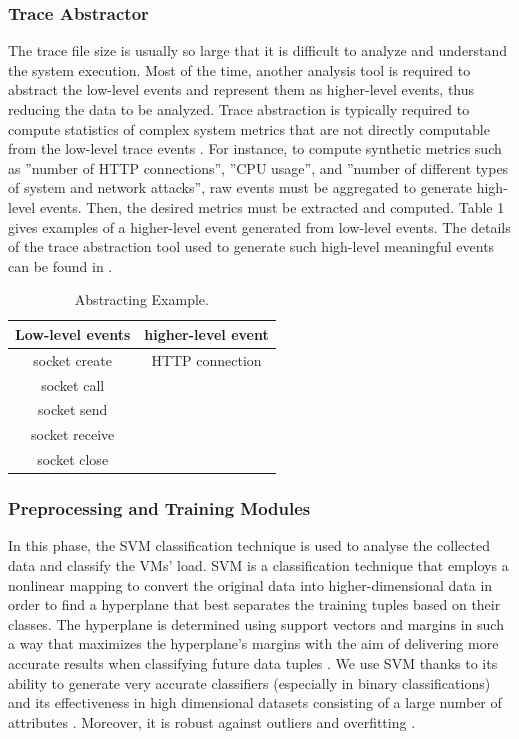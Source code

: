 \documentclass[twocolumn]{bmcart}%
\begin{document}
\subsubsection*{Trace Abstractor}
The trace file size is usually so large that it is difficult to analyze and understand the system execution. Most of the time, another analysis tool is required to abstract the low-level events and represent them as higher-level events, thus reducing the data to be analyzed. Trace abstraction is typically required to compute statistics of complex system metrics that are not directly computable from the low-level trace events \cite{ezzati2013framework}. For instance, to compute synthetic  metrics such as ”number of HTTP connections”, ”CPU usage”, and ”number of different types of system and network attacks”, raw events must be aggregated to generate high-level events. Then, the desired metrics must be extracted and computed. Table 1 gives examples of a higher-level event generated from low-level events. The details of the trace abstraction tool used to generate such high-level meaningful events can be found in \cite{ezzati2012stateful}.

\begin{table}[ht]\small
\caption{Abstracting Example.}
\centering
 \begin{tabular}{c c}
 \hline
 \textbf{Low-level events} & \textbf{higher-level event} \\
\hline
  socket create  & HTTP connection\\
  socket call  & \\
  socket send & \\
  socket receive & \\
  socket close & \\
\end{tabular}
\end{table}

\subsubsection*{Preprocessing and Training Modules}

In this phase, the SVM \cite{han2011data} classification technique is used to analyse the collected data and classify the VMs' load. SVM is a classification technique that employs a nonlinear mapping to convert the original data into higher-dimensional data in order to find a hyperplane that best separates the training tuples based on their classes. The hyperplane is determined using support vectors and margins in such a way that maximizes the hyperplane's margins with the aim of delivering more accurate results when classifying future data tuples \cite{han2011data}. We use SVM thanks to its ability to generate very accurate classifiers (especially in  binary classifications) \cite{heller2003one} and its effectiveness in high dimensional datasets consisting of a large number of attributes \cite{shon2007hybrid}. Moreover, it is robust against outliers and overfitting \cite{wahab2015misbehavior} \cite{wahab2016ceap}.
\end{document}
